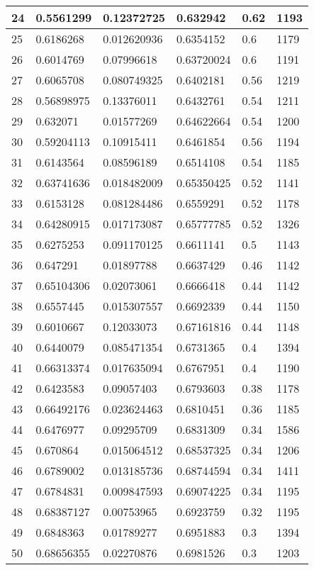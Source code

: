 \begin{longtable}{|l|l|l|l|l|l|}
24 & 0.5561299 & 0.12372725 & 0.632942 & 0.62 & 1193 \\ \hline 
25 & 0.6186268 & 0.012620936 & 0.6354152 & 0.6 & 1179 \\ \hline 
26 & 0.6014769 & 0.07996618 & 0.63720024 & 0.6 & 1191 \\ \hline 
27 & 0.6065708 & 0.080749325 & 0.6402181 & 0.56 & 1219 \\ \hline 
28 & 0.56898975 & 0.13376011 & 0.6432761 & 0.54 & 1211 \\ \hline 
29 & 0.632071 & 0.01577269 & 0.64622664 & 0.54 & 1200 \\ \hline 
30 & 0.59204113 & 0.10915411 & 0.6461854 & 0.56 & 1194 \\ \hline 
31 & 0.6143564 & 0.08596189 & 0.6514108 & 0.54 & 1185 \\ \hline 
32 & 0.63741636 & 0.018482009 & 0.65350425 & 0.52 & 1141 \\ \hline 
33 & 0.6153128 & 0.081284486 & 0.6559291 & 0.52 & 1178 \\ \hline 
34 & 0.64280915 & 0.017173087 & 0.65777785 & 0.52 & 1326 \\ \hline 
35 & 0.6275253 & 0.091170125 & 0.6611141 & 0.5 & 1143 \\ \hline 
36 & 0.647291 & 0.01897788 & 0.6637429 & 0.46 & 1142 \\ \hline 
37 & 0.65104306 & 0.02073061 & 0.6666418 & 0.44 & 1142 \\ \hline 
38 & 0.6557445 & 0.015307557 & 0.6692339 & 0.44 & 1150 \\ \hline 
39 & 0.6010667 & 0.12033073 & 0.67161816 & 0.44 & 1148 \\ \hline 
40 & 0.6440079 & 0.085471354 & 0.6731365 & 0.4 & 1394 \\ \hline 
41 & 0.66313374 & 0.017635094 & 0.6767951 & 0.4 & 1190 \\ \hline 
42 & 0.6423583 & 0.09057403 & 0.6793603 & 0.38 & 1178 \\ \hline 
43 & 0.66492176 & 0.023624463 & 0.6810451 & 0.36 & 1185 \\ \hline 
44 & 0.6476977 & 0.09295709 & 0.6831309 & 0.34 & 1586 \\ \hline 
45 & 0.670864 & 0.015064512 & 0.68537325 & 0.34 & 1206 \\ \hline 
46 & 0.6789002 & 0.013185736 & 0.68744594 & 0.34 & 1411 \\ \hline 
47 & 0.6784831 & 0.009847593 & 0.69074225 & 0.34 & 1195 \\ \hline 
48 & 0.68387127 & 0.00753965 & 0.6923759 & 0.32 & 1195 \\ \hline 
49 & 0.6848363 & 0.01789277 & 0.6951883 & 0.3 & 1394 \\ \hline 
50 & 0.68656355 & 0.02270876 & 0.6981526 & 0.3 & 1203 \\ \hline 
\end{longtable}